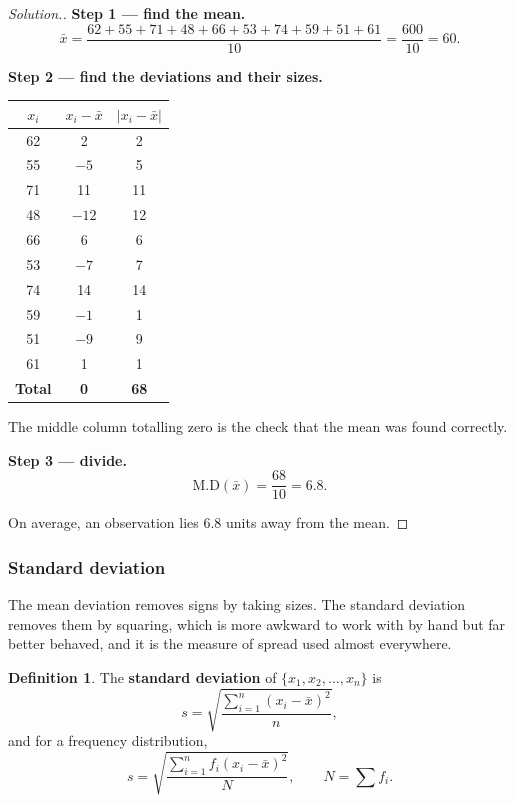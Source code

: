 \documentclass[11pt,a4paper]{article}
\theoremstyle{definition}
\newtheorem{definition}[thm]{Definition}
\newenvironment{solution}
  {\renewcommand{\qedsymbol}{}\begin{proof}[\textit{Solution}.]}
  {\end{proof}}
\begin{document}
\begin{solution}
\textbf{Step 1 --- find the mean.}
$$\bar{x}=\frac{62+55+71+48+66+53+74+59+51+61}{10}=\frac{600}{10}=60.$$

\textbf{Step 2 --- find the deviations and their sizes.}

\begin{table}[H]
\centering
\begin{tabular}{|c|c|c|}
\hline
$x_i$ & $x_i-\bar{x}$ & $\left|x_i-\bar{x}\right|$\\
\hline
62 & 2 & 2\\
55 & $-5$ & 5\\
71 & 11 & 11\\
48 & $-12$ & 12\\
66 & 6 & 6\\
53 & $-7$ & 7\\
74 & 14 & 14\\
59 & $-1$ & 1\\
51 & $-9$ & 9\\
61 & 1 & 1\\
\hline
\textbf{Total} & \textbf{0} & \textbf{68}\\
\hline
\end{tabular}
\end{table}

The middle column totalling zero is the check that the mean was found correctly.

\textbf{Step 3 --- divide.}
$$\text{M.D}(\bar{x})=\frac{68}{10}=6.8.$$

On average, an observation lies $6.8$ units away from the mean.
\end{solution}

\subsubsection{Standard deviation}

The mean deviation removes signs by taking sizes. The standard deviation removes them by
squaring, which is more awkward to work with by hand but far better behaved, and it is
the measure of spread used almost everywhere.

\begin{definition}
The \textbf{standard deviation} of $\{x_1,x_2,\ldots,x_n\}$ is
$$s=\sqrt{\frac{\sum_{i=1}^{n}\left(x_i-\bar{x}\right)^2}{n}},$$
and for a frequency distribution,
$$s=\sqrt{\frac{\sum_{i=1}^{n}f_i\left(x_i-\bar{x}\right)^2}{N}},\qquad N=\sum f_i.$$
\end{definition}
\end{document}

